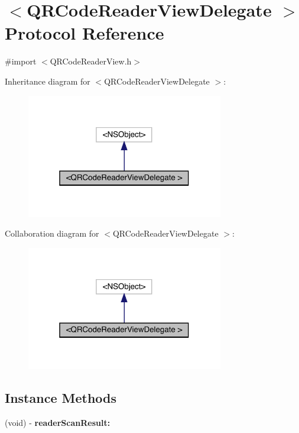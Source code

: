 \hypertarget{protocol_q_r_code_reader_view_delegate_01-p}{}\section{$<$Q\+R\+Code\+Reader\+View\+Delegate $>$ Protocol Reference}
\label{protocol_q_r_code_reader_view_delegate_01-p}


{\ttfamily \#import $<$Q\+R\+Code\+Reader\+View.\+h$>$}



Inheritance diagram for $<$Q\+R\+Code\+Reader\+View\+Delegate $>$\+:\nopagebreak
\begin{figure}[H]
\begin{center}
\leavevmode
\includegraphics[width=244pt]{protocol_q_r_code_reader_view_delegate_01-p__inherit__graph}
\end{center}
\end{figure}


Collaboration diagram for $<$Q\+R\+Code\+Reader\+View\+Delegate $>$\+:\nopagebreak
\begin{figure}[H]
\begin{center}
\leavevmode
\includegraphics[width=244pt]{protocol_q_r_code_reader_view_delegate_01-p__coll__graph}
\end{center}
\end{figure}
\subsection*{Instance Methods}
\begin{DoxyCompactItemize}
\item 
\mbox{\label{protocol_q_r_code_reader_view_delegate_01-p_a445c7ae7d4c31cc757606bdc6e0060e8}} 
(void) -\/ {\bfseries reader\+Scan\+Result\+:}
\end{DoxyCompactItemize}


